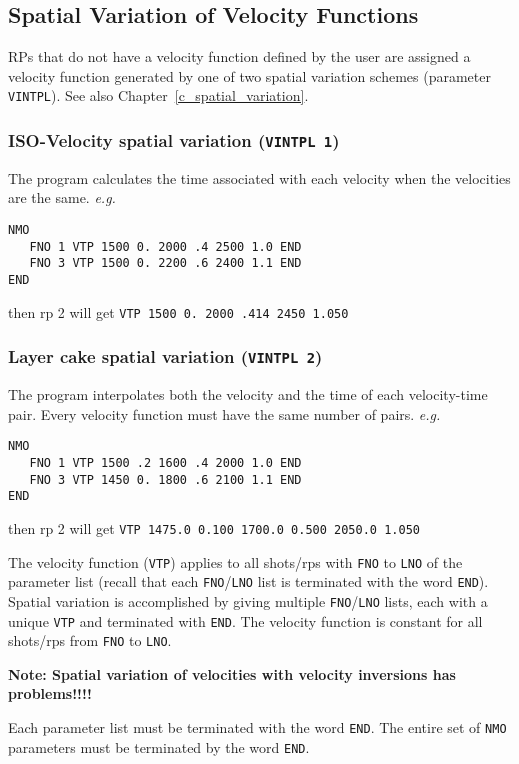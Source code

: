 \subsection{Spatial Variation of Velocity Functions}
RPs that do not have a velocity function defined by the user are
assigned a velocity function generated by one of two spatial variation
schemes (parameter \texttt{VINTPL}).  See also Chapter~\ref{c_spatial_variation}.

\subsubsection{ISO-Velocity spatial variation (\texttt{VINTPL 1})}
The program calculates the time associated with each velocity when the
velocities are the same. \textit{e.g.}
\begin{verbatim}
NMO
   FNO 1 VTP 1500 0. 2000 .4 2500 1.0 END
   FNO 3 VTP 1500 0. 2200 .6 2400 1.1 END
END
\end{verbatim}
then \gls{rp} 2 will get \texttt{VTP 1500 0. 2000 .414 2450 1.050}

\subsubsection{Layer cake spatial variation (\texttt{VINTPL 2})}
The program interpolates both the velocity and the time of each
velocity-time pair.  Every velocity function must have the same number
of pairs.  \textit{e.g.}

\begin{verbatim}
NMO
   FNO 1 VTP 1500 .2 1600 .4 2000 1.0 END
   FNO 3 VTP 1450 0. 1800 .6 2100 1.1 END
END
\end{verbatim}
then \gls{rp} 2 will get \texttt{VTP 1475.0 0.100 1700.0 0.500 2050.0 1.050}

The velocity function (\texttt{VTP}) applies to all \glspl{shot}/\glspl{rp} with \texttt{FNO} to \texttt{LNO} of
the parameter list (recall that each \texttt{FNO}/\texttt{LNO} list is terminated with the
word \texttt{END}).  Spatial variation is accomplished by giving multiple
\texttt{FNO}/\texttt{LNO} lists, each with a unique \texttt{VTP} and terminated with \texttt{END}.  The
velocity function is constant for all \glspl{shot}/\glspl{rp} from \texttt{FNO} to \texttt{LNO}.

\textbf{Note: Spatial variation of velocities with velocity inversions has problems!!!!}

Each parameter list must be terminated with the word \texttt{END}.  The entire
set of \texttt{NMO} parameters must be terminated by the word \texttt{END}.

